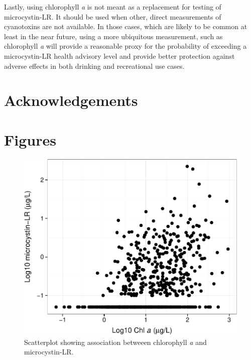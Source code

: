 \documentclass[11pt,]{article}
\begin{document}
Lastly, using chlorophyll \emph{a} is not meant as a replacement for
testing of microcystin-LR. It should be used when other, direct
measurements of cyanotoxins are not available. In those cases, which are
likely to be common at least in the near future, using a more ubiquitous
measurement, such as chlorophyll \emph{a} will provide a reasonable
proxy for the probability of exceeding a microcystin-LR health advisory
level and provide better protection against adverse effects in both
drinking and recreational use cases.

\section{Acknowledgements}\label{acknowledgements}

\newpage

\section{Figures}\label{figures}

\begin{figure}[htbp]
\centering
\includegraphics{manuscript_files/figure-latex/chla_micro_scatter-1.pdf}
\caption{Scatterplot showing association betweeen chlorophyll \textit{a}
and microcystin-LR. \label{fig:chla_micro_scatter}}
\end{figure}

\newpage
\end{document}
